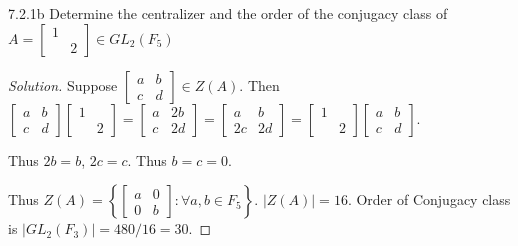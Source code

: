\documentclass{article}
\newenvironment{solution}
{\renewcommand\qedsymbol{$\blacksquare$}\begin{proof}[Solution]}
{\end{proof}}
\begin{document}
\begin{PROB}{7.2.1b}\label{Problem 7.2.1b.}
    Determine the centralizer and the order of the conjugacy class of
    $A = \begin{bmatrix}
        1 & \\ & 2
    \end{bmatrix} \in GL_2(F_5)$
\end{PROB}
\begin{solution}
    Suppose $\begin{bmatrix}
        a & b \\ c & d
    \end{bmatrix} \in Z(A)$. Then $\begin{bmatrix}
        a & b \\ c & d
    \end{bmatrix}\begin{bmatrix}
        1 & \\ & 2
    \end{bmatrix} = \begin{bmatrix}
        a & 2b \\ c & 2d
    \end{bmatrix} = \begin{bmatrix}
        a & b  \\ 2c & 2d
    \end{bmatrix} = \begin{bmatrix}
        1 &  \\  & 2
    \end{bmatrix}\begin{bmatrix}
        a & b \\ c & d
    \end{bmatrix}$.

    Thus $2b = b$, $2c = c$. Thus $b = c = 0$.

    Thus $ Z(A) = \left\{ \begin{bmatrix}
        a & 0 \\ 0 & b
    \end{bmatrix} : \forall a, b \in F_5 \right\}$. $|Z(A)| = 16$. Order of Conjugacy class is $|GL_2(F_3)| = 480/16 = 30$.
\end{solution}

\bigskip
\end{document}
